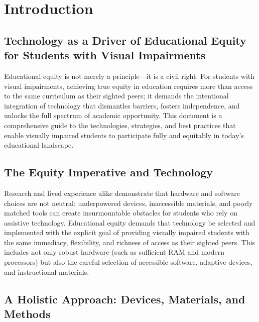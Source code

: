 \chapter{Introduction}\label{ch:introduction}

\section{Technology as a Driver of Educational Equity for Students with Visual Impairments}
\label{sec:intro-tech-equity}

Educational equity is not merely a principle—it is a civil right.\supercite{ADA1990, IDEA2004} For students with visual impairments, achieving true equity in education requires more than access to the same curriculum as their sighted peers; it demands the intentional integration of technology that dismantles barriers, fosters independence, and unlocks the full spectrum of academic opportunity.\supercite{Kelly2011, Day2021} This document is a comprehensive guide to the technologies, strategies, and best practices that enable visually impaired students to participate fully and equitably in today’s educational landscape.

\section{The Equity Imperative and Technology}
\label{sec:intro-equity-imperative}

Research and lived experience alike demonstrate that hardware and software choices are not neutral: underpowered devices, inaccessible materials, and poorly matched tools can create insurmountable obstacles for students who rely on assistive technology. Educational equity demands that technology be selected and implemented with the explicit goal of providing visually impaired students with the same immediacy, flexibility, and richness of access as their sighted peers. This includes not only robust hardware (such as sufficient RAM and modern processors) but also the careful selection of accessible software, adaptive devices, and instructional materials.

\section{A Holistic Approach: Devices, Materials, and Methods}
\label{sec:intro-holistic-approach}

